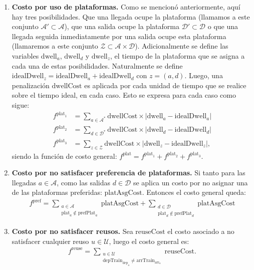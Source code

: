 \documentclass[letter, 10pt]{article}
\begin{document}
\begin{enumerate}
        \item \textbf{Costo por uso de plataformas.} Como se mencionó anteriormente, aquí hay tres posibilidades. Que una llegada ocupe la plataforma (llamamos a este conjunto $\mathcal{A}' \subset \mathcal{A}$), que una salida ocupe la plataforma $\mathcal{D}' \subset \mathcal{D}$ o que una llegada seguida inmediatamente por una salida ocupe esta plataforma (llamaremos a este conjunto $\mathcal{Z} \subset \mathcal{A}\times \mathcal{D}$). Adicionalmente se define las variables $\text{dwell}_a$, $\text{dwell}_d$ y $\text{dwell}_z$, el tiempo de la plataforma que se asigna a cada una de estas posibilidades. Naturalmente se define $\text{idealDwell}_z = \text{idealDwell}_a + \text{idealDwell}_d$ con $z=(a,d)$. Luego, una penalización $\text{dwellCost}$ es aplicada por cada unidad de tiempo que se realice sobre el tiempo ideal, en cada caso. Esto se expresa para cada caso como sigue:
        \begin{align*}
            f^{\text{plat}_1} &= \sum_{a \in \mathcal{A}^*} \text{dwellCost}\times |\text{dwell}_a - \text{idealDwell}_a| \\
            f^{\text{plat}_2} &= \sum_{d \in \mathcal{D}^*} \text{dwellCost}\times |\text{dwell}_d - \text{idealDwell}_d| \\
            f^{\text{plat}_3} &= \sum_{z \in \mathcal{Z}} \text{dwellCost}\times |\text{dwell}_z - \text{idealDwell}_z|,
        \end{align*}
        siendo la función de costo general: $f^{\text{plat}} = f^{\text{plat}_1} + f^{\text{plat}_2} + f^{\text{plat}_3}$.

        \item \textbf{Costo por no satisfacer preferencia de plataformas.} Si tanto para las llegadas $a \in \mathcal{A}$, como las salidas $d \in \mathcal{D}$ se aplica un costo por no asignar una de las plataformas preferidas: $\text{platAsgCost}$. Entonces el costo general queda:
        \begin{align*}
            f^{\text{pref}} = \sum_{\substack{a \in \mathcal{A} \\  \text{plat}_a \notin \text{prefPlat}_a}} \text{platAsgCost} + \sum_{\substack{d \in \mathcal{D} \\  \text{plat}_d \notin \text{prefPlat}_d}} \text{platAsgCost}
        \end{align*}


        \item \textbf{Costo por no satisfacer reusos.} Sea $\text{reuseCost}$ el costo asociado a no satisfacer cualquier reuso $u \in \mathcal{U}$, luego el costo general es:
        \begin{align*}
             f^{\text{reuse}} = \sum_{\substack{u \in \mathcal{U} \\ \text{depTrain}_{\text{dep}_u}\neq \text{arrTrain}_{\text{arr}_u}}} \text{reuseCost}.    
        \end{align*}
    \end{enumerate}
\end{document}

